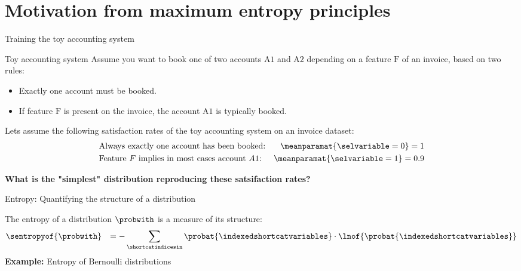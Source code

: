 \documentclass{beamer}
\begin{document}
    \section{Motivation from maximum entropy principles}

    \begin{frame}{Training the toy accounting system}

        \begin{block}{Toy accounting system}
            Assume you want to book one of two accounts $\mathrm{A1}$ and $\mathrm{A2}$ depending on a feature $\mathrm{F}$ of an invoice, based on two rules:
            \begin{itemize}
                \item \textcolor{\concolor}{Exactly one account must be booked.}
                \item \textcolor{\probcolor}{If feature $\mathrm{F}$ is present on the invoice, the account $\mathrm{A1}$ is typically booked.}
            \end{itemize}
        \end{block}

        Lets assume the following satisfaction rates of the toy accounting system on an invoice dataset:
        \begin{align*}
            &\text{Always exactly one account has been booked:}     &\meanparamat{\selvariable=0} = 1 \\
            &\text{Feature $F$ implies in most cases account $A1$:} &\meanparamat{\selvariable=1} = 0.9
        \end{align*}

        \begin{center}
            \bf What is the "simplest" distribution reproducing these satsifaction rates?
        \end{center}


    \end{frame}


    \begin{frame}{Entropy: Quantifying the structure of a distribution}

        The entropy of a distribution $\probwith$ is a measure of its structure:
        \begin{align*}
            &\sentropyof{\probwith}
            &= -\sum_{\shortcatindicesin} \probat{\indexedshortcatvariables} \cdot \lnof{\probat{\indexedshortcatvariables}}
        \end{align*}
            {\bf Example:} Entropy of Bernoulli distributions \\
        \begin{center}
            
        \end{center}

    \end{frame}
\end{document}

